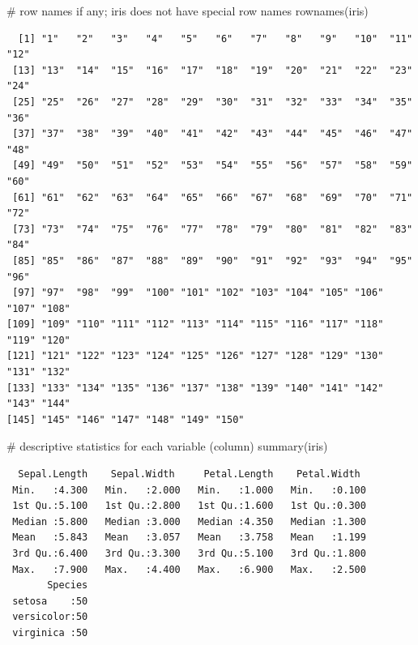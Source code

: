 \documentclass[
  letterpaper,
  DIV=11,
  numbers=noendperiod]{scrreprt}
\newenvironment{Shaded}{\begin{snugshade}}{\end{snugshade}}
\newcommand{\CommentTok}[1]{\textcolor[rgb]{0.37,0.37,0.37}{#1}}
\newcommand{\FunctionTok}[1]{\textcolor[rgb]{0.28,0.35,0.67}{#1}}
\newcommand{\NormalTok}[1]{\textcolor[rgb]{0.00,0.23,0.31}{#1}}
\begin{document}
\begin{tcolorbox}
\begin{Shaded}
\begin{Highlighting}[]
\CommentTok{\# row names if any; iris does not have special row names}
\FunctionTok{rownames}\NormalTok{(iris)}
\end{Highlighting}
\end{Shaded}

\begin{verbatim}
  [1] "1"   "2"   "3"   "4"   "5"   "6"   "7"   "8"   "9"   "10"  "11"  "12" 
 [13] "13"  "14"  "15"  "16"  "17"  "18"  "19"  "20"  "21"  "22"  "23"  "24" 
 [25] "25"  "26"  "27"  "28"  "29"  "30"  "31"  "32"  "33"  "34"  "35"  "36" 
 [37] "37"  "38"  "39"  "40"  "41"  "42"  "43"  "44"  "45"  "46"  "47"  "48" 
 [49] "49"  "50"  "51"  "52"  "53"  "54"  "55"  "56"  "57"  "58"  "59"  "60" 
 [61] "61"  "62"  "63"  "64"  "65"  "66"  "67"  "68"  "69"  "70"  "71"  "72" 
 [73] "73"  "74"  "75"  "76"  "77"  "78"  "79"  "80"  "81"  "82"  "83"  "84" 
 [85] "85"  "86"  "87"  "88"  "89"  "90"  "91"  "92"  "93"  "94"  "95"  "96" 
 [97] "97"  "98"  "99"  "100" "101" "102" "103" "104" "105" "106" "107" "108"
[109] "109" "110" "111" "112" "113" "114" "115" "116" "117" "118" "119" "120"
[121] "121" "122" "123" "124" "125" "126" "127" "128" "129" "130" "131" "132"
[133] "133" "134" "135" "136" "137" "138" "139" "140" "141" "142" "143" "144"
[145] "145" "146" "147" "148" "149" "150"
\end{verbatim}

\begin{Shaded}
\begin{Highlighting}[]
\CommentTok{\# descriptive statistics for each variable (column)}
\FunctionTok{summary}\NormalTok{(iris)}
\end{Highlighting}
\end{Shaded}

\begin{verbatim}
  Sepal.Length    Sepal.Width     Petal.Length    Petal.Width   
 Min.   :4.300   Min.   :2.000   Min.   :1.000   Min.   :0.100  
 1st Qu.:5.100   1st Qu.:2.800   1st Qu.:1.600   1st Qu.:0.300  
 Median :5.800   Median :3.000   Median :4.350   Median :1.300  
 Mean   :5.843   Mean   :3.057   Mean   :3.758   Mean   :1.199  
 3rd Qu.:6.400   3rd Qu.:3.300   3rd Qu.:5.100   3rd Qu.:1.800  
 Max.   :7.900   Max.   :4.400   Max.   :6.900   Max.   :2.500  
       Species  
 setosa    :50  
 versicolor:50  
 virginica :50  
                
                
                

\end{verbatim}
\end{tcolorbox}
\end{document}

